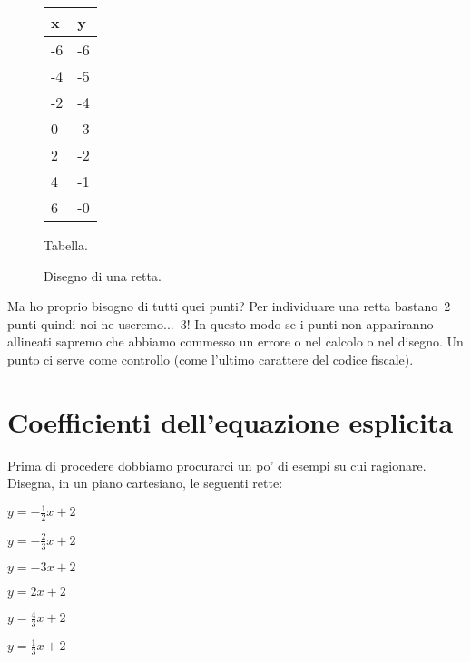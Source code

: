 \begin{inaccessibleblock}
 \begin{figure}[h]
 \centering
 \begin{minipage}[]{.50\textwidth}
  \begin{center}
   \begin{tabular}{l|l}
    x   & y \\
    \hline
    -6 & -6 \\
    -4 & -5 \\
    -2 & -4 \\
     0 & -3 \\
     2 & -2 \\
     4 & -1 \\
     6 & -0
   \end{tabular}
  \end{center}
  \caption{Tabella.}\label{fig:tabella}
 \end{minipage}
 \begin{minipage}[]{.40\textwidth}
   \centering
  \caption{Disegno di una retta.}\label{fig:retta02}
 \end{minipage}
\end{figure}
\end{inaccessibleblock}

Ma ho proprio bisogno di tutti quei punti? Per individuare una retta 
bastano~2 punti quindi noi ne useremo...~3! In questo modo se 
i punti non appariranno allineati sapremo che abbiamo commesso un errore o 
nel calcolo o nel disegno. Un punto ci serve come controllo 
(come l'ultimo carattere del codice fiscale).

\section{Coefficienti dell'equazione esplicita}
\label{sec:retta_coefficienti}

Prima di procedere dobbiamo procurarci un po' di esempi su cui ragionare.
Disegna, in un piano cartesiano, le seguenti rette:

\begin{multicols}{3}
 \TabPositions{0.6cm}
 \begin{enumeratea}
 \item $y=-\frac{1}{2}x + 2$
 \item $y=-\frac{2}{3}x + 2$
 \item $y=-{3}x + 2$
 \item $y={2}x + 2$
 \item $y=\frac{4}{3}x + 2$
 \item $y=\frac{1}{3}x + 2$
 \end{enumeratea}
\end{multicols}

